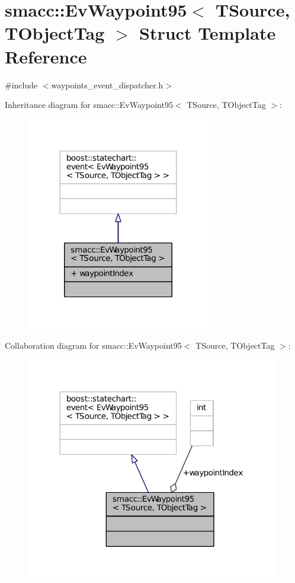 \hypertarget{structsmacc_1_1EvWaypoint95}{}\section{smacc\+:\+:Ev\+Waypoint95$<$ T\+Source, T\+Object\+Tag $>$ Struct Template Reference}
\label{structsmacc_1_1EvWaypoint95}


{\ttfamily \#include $<$waypoints\+\_\+event\+\_\+dispatcher.\+h$>$}



Inheritance diagram for smacc\+:\+:Ev\+Waypoint95$<$ T\+Source, T\+Object\+Tag $>$\+:
\nopagebreak
\begin{figure}[H]
\begin{center}
\leavevmode
\includegraphics[width=227pt]{structsmacc_1_1EvWaypoint95__inherit__graph}
\end{center}
\end{figure}


Collaboration diagram for smacc\+:\+:Ev\+Waypoint95$<$ T\+Source, T\+Object\+Tag $>$\+:
\nopagebreak
\begin{figure}[H]
\begin{center}
\leavevmode
\includegraphics[width=312pt]{structsmacc_1_1EvWaypoint95__coll__graph}
\end{center}
\end{figure}
